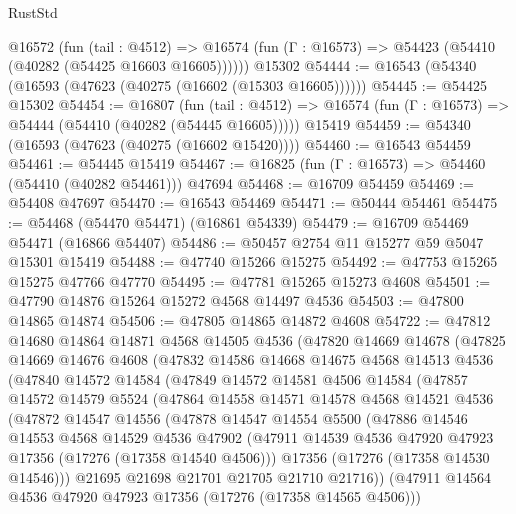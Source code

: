 \begin{lexlean}{RustStd}
\begin{coremodule}
    @16572
      (fun (tail : @4512) =>
      @16574 (fun (Γ : @16573) => @54423 (@54410 (@40282 (@54425 @16603 @16605))))))
    @15302
@54444 := @16543 (@54340 (@16593 (@47623 (@40275 (@16602 (@15303 @16605))))))
@54445 := @54425 @15302
@54454 := @16807
    (fun (tail : @4512) => @16574 (fun (Γ : @16573) => @54444 (@54410 (@40282 (@54445 @16605)))))
    @15419
@54459 := @54340 (@16593 (@47623 (@40275 (@16602 @15420))))
@54460 := @16543 @54459
@54461 := @54445 @15419
@54467 := @16825 (fun (Γ : @16573) => @54460 (@54410 (@40282 @54461))) @47694
@54468 := @16709 @54459
@54469 := @54408 @47697
@54470 := @16543 @54469
@54471 := @50444 @54461
@54475 := @54468 (@54470 @54471) (@16861 @54339)
@54479 := @16709 @54469 @54471 (@16866 @54407)
@54486 := @50457 @2754 @11 @15277 @59 @5047 @15301 @15419
@54488 := @47740 @15266 @15275
@54492 := @47753 @15265 @15275 @47766 @47770
@54495 := @47781 @15265 @15273 @4608
@54501 := @47790 @14876 @15264 @15272 @4568 @14497 @4536
@54503 := @47800 @14865 @14874
@54506 := @47805 @14865 @14872 @4608
@54722 := @47812
    @14680
    @14864
    @14871
    @4568
    @14505
    @4536
    (@47820
      @14669
      @14678
      (@47825
        @14669
        @14676
        @4608
        (@47832
          @14586
          @14668
          @14675
          @4568
          @14513
          @4536
          (@47840
            @14572
            @14584
            (@47849
              @14572
              @14581
              @4506
              @14584
              (@47857
                @14572
                @14579
                @5524
                (@47864
                  @14558
                  @14571
                  @14578
                  @4568
                  @14521
                  @4536
                  (@47872
                    @14547
                    @14556
                    (@47878
                      @14547
                      @14554
                      @5500
                      (@47886
                        @14546
                        @14553
                        @4568
                        @14529
                        @4536
                        @47902
                        (@47911 @14539 @4536 @47920 @47923 @17356 (@17276 (@17358 @14540 @4506)))
                        @17356
                        (@17276 (@17358 @14530 @14546)))
                      @21695
                      @21698
                      @21701
                      @21705
                      @21710
                      @21716))
                  (@47911 @14564 @4536 @47920 @47923 @17356 (@17276 (@17358 @14565 @4506)))

\end{coremodule}
\end{lexlean}
